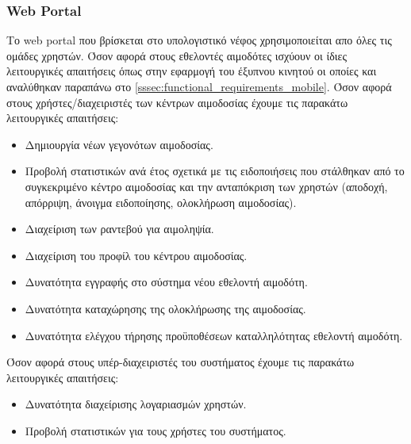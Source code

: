 			\subsubsection{Web Portal} \label{sssec:functional_requirements_web}
				Το web portal που βρίσκεται στο υπολογιστικό νέφος χρησιμοποιείται απο όλες τις ομάδες χρηστών. Όσον αφορά στους εθελοντές αιμοδότες ισχύουν οι ίδιες λειτουργικές απαιτήσεις όπως στην εφαρμογή του έξυπνου κινητού οι οποίες και αναλύθηκαν παραπάνω στο \ref{sssec:functional_requirements_mobile}. Όσον αφορά στους χρήστες/διαχειριστές των κέντρων αιμοδοσίας έχουμε τις παρακάτω λειτουργικές απαιτήσεις:
				\begin{itemize}
					\item Δημιουργία νέων γεγονότων αιμοδοσίας.
					\item Προβολή στατιστικών ανά έτος σχετικά με τις ειδοποιήσεις που στάλθηκαν από το συγκεκριμένο κέντρο αιμοδοσίας και την ανταπόκριση των χρηστών (αποδοχή, απόρριψη, άνοιγμα ειδοποίησης, ολοκλήρωση αιμοδοσίας).
					\item Διαχείριση των ραντεβού για αιμοληψία.
					\item Διαχείριση του προφίλ του κέντρου αιμοδοσίας.
					\item Δυνατότητα εγγραφής στο σύστημα νέου εθελοντή αιμοδότη.
					\item Δυνατότητα καταχώρησης της ολοκλήρωσης της αιμοδοσίας.
					\item Δυνατότητα ελέγχου τήρησης προϋποθέσεων καταλληλότητας εθελοντή αιμοδότη.
				\end{itemize}
				Όσον αφορά στους υπέρ-διαχειριστές του συστήματος έχουμε τις παρακάτω λειτουργικές απαιτήσεις:
				\begin{itemize}
					\item Δυνατότητα διαχείρισης λογαριασμών χρηστών.
					\item Προβολή στατιστικών για τους χρήστες του συστήματος.
				\end{itemize}

	
